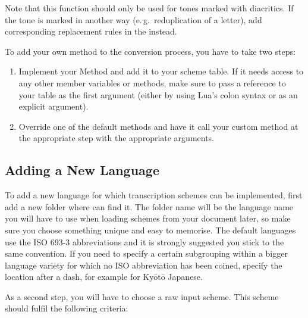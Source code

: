 \documentclass{ltxdockit}
\begin{document}
Note that this function should only be used for tones marked with diacritics. If
the tone is marked in another way (e.\,g.\ reduplication of a letter), add
corresponding replacement rules in the
 instead.


To add your own method to the conversion process, you have to take two steps:

\begin{enumerate}
  \item Implement your Method and add it to your scheme table. If it needs
    access to any other member variables or methods, make sure to pass a
    reference to your table as the first argument (either by using Lua's colon
    syntax or as an explicit argument).
  \item Override one of the default methods and have it call your custom method
    at the appropriate step with the appropriate arguments.
\end{enumerate}

\subsection{Adding a New Language}

To add a new language for which transcription schemes can be implemented, first
add a new folder where  can find it. The folder name will be the
language name you will have to use when loading schemes from your document
later, so make sure you choose something unique and easy to memorise. The
default languages use the ISO 693-3 abbreviations and it is strongly suggested you
stick to the same convention. If you need to specify a certain subgrouping
within a bigger language variety for which no ISO abbreviation has been coined,
specify the location after a dash, for example  for
Ky\={o}t\={o} Japanese.

As a second step, you will have to choose a raw input scheme. This scheme should
fulfil the following criteria:
\end{document}

